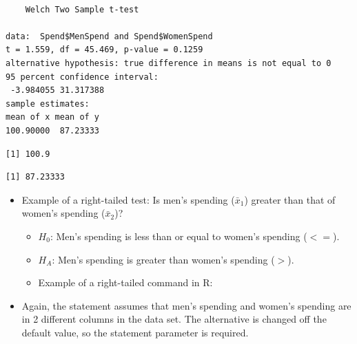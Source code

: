 \documentclass[
  letterpaper,
  DIV=11,
  numbers=noendperiod]{scrreprt}
\newenvironment{Shaded}{\begin{snugshade}}{\end{snugshade}}
\newcommand{\CommentTok}[1]{\textcolor[rgb]{0.37,0.37,0.37}{#1}}
\newcommand{\FunctionTok}[1]{\textcolor[rgb]{0.28,0.35,0.67}{#1}}
\newcommand{\NormalTok}[1]{\textcolor[rgb]{0.00,0.23,0.31}{#1}}
\newcommand{\SpecialCharTok}[1]{\textcolor[rgb]{0.37,0.37,0.37}{#1}}
\providecommand{\tightlist}{%
  \setlength{\itemsep}{0pt}\setlength{\parskip}{0pt}}\usepackage{longtable,booktabs,array}
\begin{document}
\begin{Shaded}
\end{Shaded}

\begin{verbatim}

    Welch Two Sample t-test

data:  Spend$MenSpend and Spend$WomenSpend
t = 1.559, df = 45.469, p-value = 0.1259
alternative hypothesis: true difference in means is not equal to 0
95 percent confidence interval:
 -3.984055 31.317388
sample estimates:
mean of x mean of y 
100.90000  87.23333 
\end{verbatim}

\begin{Shaded}
\end{Shaded}

\begin{verbatim}
[1] 100.9
\end{verbatim}

\begin{Shaded}
\end{Shaded}

\begin{verbatim}
[1] 87.23333
\end{verbatim}

\begin{itemize}
\tightlist
\item
  Example of a right-tailed test: Is men's spending (\(\bar{x}_1\))
  greater than that of women's spending (\(\bar{x}_2\))?

  \begin{itemize}
  \tightlist
  \item
    \(H_0\): Men's spending is less than or equal to women's spending
    (\(<=\)).
  \item
    \(H_A\): Men's spending is greater than women's spending (\(>\)).
  \item
    Example of a right-tailed command in R:
  \end{itemize}
\item
  Again, the statement assumes that men's spending and women's spending
  are in 2 different columns in the data set. The alternative is changed
  off the default value, so the statement parameter is required.
\end{itemize}
\end{document}
